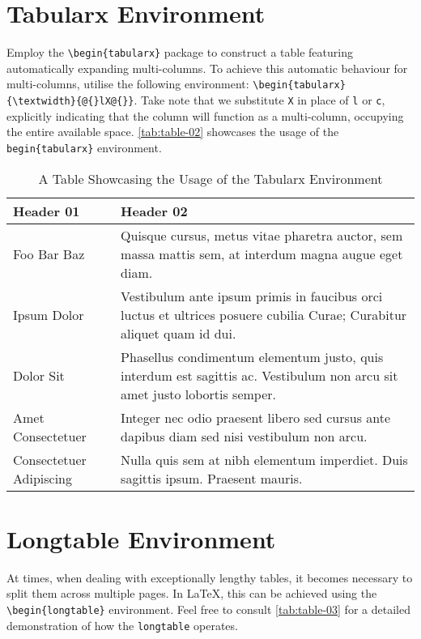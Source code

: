 \section{Tabularx Environment}
Employ the \verb|\begin{tabularx}| package to construct a table featuring automatically expanding multi-columns. To achieve this automatic behaviour for multi-columns, utilise the following environment: \verb|\begin{tabularx}{\textwidth}{@{}lX@{}}|. Take note that we substitute \verb|X| in place of \verb|l| or \verb|c|, explicitly indicating that the column will function as a multi-column, occupying the entire available space. \autoref{tab:table-02} showcases the usage of the \verb|begin{tabularx}| environment.

\begin{table}[!htpb]
    \caption{A Table Showcasing the Usage of the Tabularx Environment}
    \label{tab:table-02}
    \begin{tabularx}{\textwidth}{@{}lX@{}}
        \toprule
        Header 01 & Header 02 \\ 
        \midrule
        Foo Bar Baz & Quisque cursus, metus vitae pharetra auctor, sem massa mattis sem, at interdum magna augue eget diam. \\
        Ipsum Dolor & Vestibulum ante ipsum primis in faucibus orci luctus et ultrices posuere cubilia Curae; Curabitur aliquet quam id dui. \\
        Dolor Sit & Phasellus condimentum elementum justo, quis interdum est sagittis ac. Vestibulum non arcu sit amet justo lobortis semper. \\
        Amet Consectetuer & Integer nec odio praesent libero sed cursus ante dapibus diam sed nisi vestibulum non arcu. \\
        Consectetuer Adipiscing & Nulla quis sem at nibh elementum imperdiet. Duis sagittis ipsum. Praesent mauris. \\
        \bottomrule
    \end{tabularx}
\end{table}

\section{Longtable Environment}
At times, when dealing with exceptionally lengthy tables, it becomes necessary to split them across multiple pages. In \LaTeX, this can be achieved using the \verb|\begin{longtable}| environment. Feel free to consult \autoref{tab:table-03} for a detailed demonstration of how the \verb|longtable| operates.

